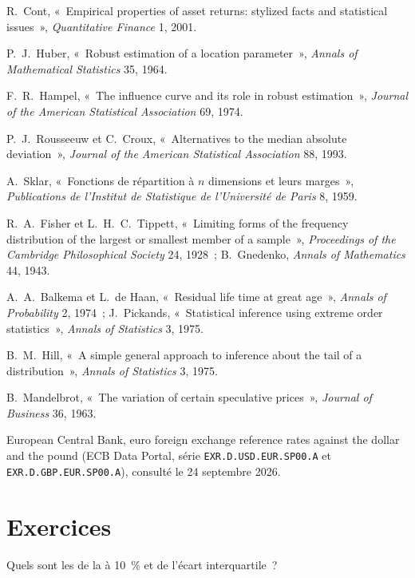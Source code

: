 \begin{omsources}
\item R.~Cont, «~Empirical properties of asset returns: stylized facts and statistical issues~», \emph{Quantitative Finance} 1, 2001.
\item P.~J.~Huber, «~Robust estimation of a location parameter~», \emph{Annals of Mathematical Statistics} 35, 1964.
\item F.~R.~Hampel, «~The influence curve and its role in robust estimation~», \emph{Journal of the American Statistical Association} 69, 1974.
\item P.~J.~Rousseeuw et C.~Croux, «~Alternatives to the median absolute deviation~», \emph{Journal of the American Statistical Association}
88, 1993.
\item A.~Sklar, «~Fonctions de répartition à $n$ dimensions et leurs marges~», \emph{Publications de l'Institut de Statistique de
l'Université de Paris} 8, 1959.
\item R.~A.~Fisher et L.~H.~C.~Tippett, «~Limiting forms of the frequency distribution of the largest or smallest member of a sample~»,
\emph{Proceedings of the Cambridge Philosophical Society} 24, 1928~; B.~Gnedenko, \emph{Annals of Mathematics} 44, 1943.
\item A.~A.~Balkema et L.~de Haan, «~Residual life time at great age~», \emph{Annals of Probability} 2, 1974~; J.~Pickands, «~Statistical
inference using extreme order statistics~», \emph{Annals of Statistics} 3, 1975.
\item B.~M.~Hill, «~A simple general approach to inference about the tail of a distribution~», \emph{Annals of Statistics} 3, 1975.
\item B.~Mandelbrot, «~The variation of certain speculative prices~», \emph{Journal of Business} 36, 1963.
\item European Central Bank, euro foreign exchange reference rates against the dollar and the pound (ECB Data Portal, série
\texttt{EXR.D.USD.EUR.SP00.A} et \texttt{EXR.D.GBP.EUR.SP00.A}), consulté le 24 septembre 2026.
\end{omsources}

\section{Exercices}

\begin{exercise}[$\star$]\label{exo:qm:robust-statistics-and-heavy-tails:1}
Quels sont les  de la  à 10~\% et de l'écart interquartile~?
\end{exercise}

